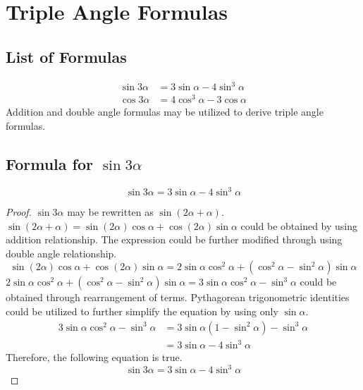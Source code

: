 \documentclass{article}
\begin{document}
\section{Triple Angle Formulas}
\subsection{List of Formulas}
\begin{align*}
    \sin3\alpha&=3\sin\alpha-4\sin^3\alpha \\
    \cos3\alpha&=4\cos^3\alpha-3\cos\alpha
\end{align*}
\noindent
Addition and double angle formulas may be utilized to derive triple angle formulas.

\subsection{Formula for $\sin3\alpha$}
    \[
    \sin3\alpha=3\sin\alpha-4\sin^3\alpha
    \]
\begin{proof}
    $\sin3\alpha$ may be rewritten as $\sin(2\alpha+\alpha)$. $\sin(2\alpha+\alpha)=\sin(2\alpha)\cos\alpha+\cos(2\alpha)\sin\alpha$ could be obtained by using addition relationship. The expression could be further modified through using double angle relationship.
    \[
    \sin(2\alpha)\cos\alpha+\cos(2\alpha)\sin\alpha=2\sin\alpha\cos^2\alpha+(\cos^2\alpha-\sin^2\alpha)\sin\alpha
    \]
    $2\sin\alpha\cos^2\alpha+(\cos^2\alpha-\sin^2\alpha)\sin\alpha=3\sin\alpha\cos^2\alpha-\sin^3\alpha$ could be obtained through rearrangement of terms. Pythagorean trigonometric identities could be utilized to further simplify the equation by using only $\sin\alpha$.
    \begin{align*}
    3\sin\alpha\cos^2\alpha-\sin^3\alpha&=3\sin\alpha(1-\sin^2\alpha)-\sin^3\alpha \\
    &=3\sin\alpha-4\sin^3\alpha
    \end{align*}
    Therefore, the following equation is true.
    \[
    \sin3\alpha=3\sin\alpha-4\sin^3\alpha
    \]
\end{proof}
\end{document}
